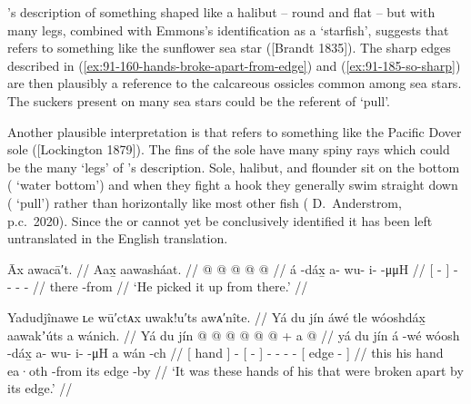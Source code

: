 \citeauthor{swanton:1909}’s description of something shaped like a halibut – round and flat – but with many legs, combined with Emmons’s identification as a ‘starfish’, suggests that  refers to something like the sunflower sea star ([Brandt 1835]).
The sharp edges described in (\ref{ex:91-160-hands-broke-apart-from-edge}) and (\ref{ex:91-185-so-sharp}) are then plausibly a reference to the calcareous ossicles common among sea stars. The suckers present on many sea stars could be the referent of  ‘pull’.

Another plausible interpretation is that  refers to something like the Pacific Dover sole ([Lockington 1879]).
The fins of the sole have many spiny rays which could be the many ‘legs’ of \citeauthor{swanton:1909}’s description.
Sole, halibut, and flounder sit on the bottom ( ‘water bottom’) and when they fight a hook they generally swim straight down ( ‘pull’) rather than horizontally like most other fish ( D.\ Anderstrom, p.c.\ 2020).
Since the  or  cannot yet be conclusively identified it has been left untranslated in the English translation.

\ex\label{ex:91-159-grabbed-from-there}%
%
\begingl
	\glpreamble	Āx awacā′t. //
	\glpreamble	Aax̱ aawasháat. //
	\gla	{}  @ {} {}  @ {} @ {} @ {} @ {} //
	\glb	{} á -dáx̱ {} a- wu- i-  -μμH //
	\glc	{}[  - {}]
		- - -  - //
	\gld	{} there -from {}  //
	\glft	‘He picked it up from there.’
		//
\endgl
\xe

\ex\label{ex:91-160-hands-broke-apart-from-edge}%
%
\begingl
	\glpreamble	Yadudjînawe ʟe wū′ctᴀx uwak!u′ts awᴀ′nîte. //
	\glpreamble	Yá du jín áwé tle wóoshdáx̱ aawakʼúts a wánich. //
	\gla	{} Yá du jín {}  @ {}
		{}  @ {} {}
		 @ {} @ {} @ {} @ {} +
		{} a  @ {} {} //
	\glb	{} yá du jín {} á -wé
		{} wóosh -dáx̱ {}
		a- wu- i-  -μH
		{} a wán -ch {} //
	\glc	{}[   hand {}]  -
		{}[  - {}]
		- - -  -
		{}[  edge - {}] //
	\gld	{} this his hand {}  {}
		{} ea·oth -from {}
		 {} {} {} {}
		{} its edge -by {} //
	\glft	‘It was these hands of his that were broken apart by its edge.’
		//
\endgl
\xe

